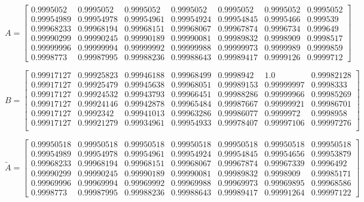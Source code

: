 \tiny
\begin{equation*}
    A = 
    \begin{bmatrix}
        0.9995052 & 0.9995052 & 0.9995052 & 0.9995052 & 0.9995052 & 0.9995052 & 0.9995052 \\
        0.99954989 & 0.99954978 & 0.99954961 & 0.99954924 & 0.99954845 & 0.9995466 & 0.999539 \\
        0.99968233 & 0.99968194 & 0.99968151 & 0.99968067 & 0.99967874 & 0.9996734 & 0.999649  \\
        0.99990299 & 0.99990245 & 0.99990189 & 0.99990081 & 0.99989832 & 0.9998909 & 0.9998517 \\
        0.99999996 & 0.99999994 & 0.99999992 & 0.99999988 & 0.99999973 & 0.9999989 & 0.9999859 \\
        0.9998773 & 0.99987995 & 0.99988236 & 0.99988643 & 0.99989417 & 0.9999126 & 0.9999712
    \end{bmatrix}
\end{equation*}

\begin{equation*}
    B = 
    \begin{bmatrix}
        0.99917127 & 0.99925823 & 0.99946188 & 0.99968499 & 0.9998942 &  1.0 & 0.99982128 \\
        0.99917127 & 0.99925479 & 0.99945638 & 0.99968051 & 0.99989153 & 0.99999997 & 0.9998333  \\
        0.99917127 & 0.99924532 & 0.99943793 & 0.99966451 & 0.99988286 & 0.99999966 & 0.99985269 \\
        0.99917127 & 0.99924146 & 0.99942878 & 0.99965484 & 0.99987667 & 0.99999921 & 0.99986701 \\
        0.99917127 & 0.9992342 &  0.99941013 & 0.99963286 & 0.99986077 & 0.9999972 & 0.9998958  \\
        0.99917127 & 0.99921279 & 0.99934961 & 0.99954933 & 0.99978407 & 0.99997106 & 0.99997276 \\
    \end{bmatrix}
\end{equation*}

\begin{equation*}
    \tilde{A} = 
    \begin{bmatrix}
        0.99950518 & 0.99950518 & 0.99950518 & 0.99950518 & 0.99950518 & 0.99950518 & 0.99950518 \\
        0.99954989 & 0.99954978 & 0.99954961 & 0.99954924 & 0.99954845 & 0.99954656 & 0.99953879 \\
        0.99968233 & 0.99968194 & 0.99968151 & 0.99968067 & 0.99967874 & 0.99967339 & 0.9996492  \\
        0.99990299 & 0.99990245 & 0.99990189 & 0.99990081 & 0.99989832 & 0.9998909 & 0.99985171 \\
        0.99969996 & 0.99969994 & 0.99969992 & 0.99969988 & 0.99969973 & 0.99969895 & 0.99968586 \\
        0.9998773 &  0.99987995 & 0.99988236 & 0.99988643 & 0.99989417 & 0.99991264 & 0.99997122
    \end{bmatrix}
\end{equation*}

